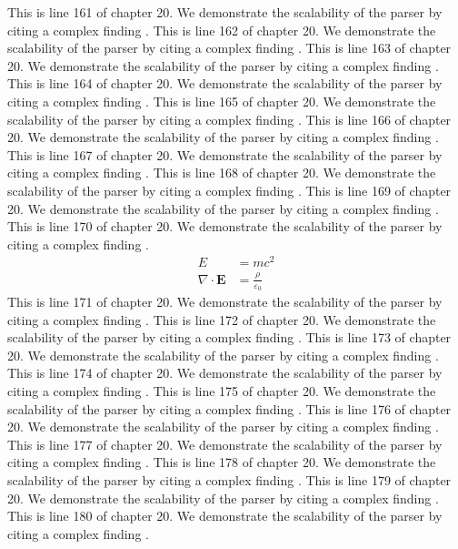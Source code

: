 This is line 161 of chapter 20. We demonstrate the scalability of the parser by citing a complex finding \cite{ref20_161}.
This is line 162 of chapter 20. We demonstrate the scalability of the parser by citing a complex finding \cite{ref20_162}.
This is line 163 of chapter 20. We demonstrate the scalability of the parser by citing a complex finding \cite{ref20_163}.
This is line 164 of chapter 20. We demonstrate the scalability of the parser by citing a complex finding \cite{ref20_164}.
This is line 165 of chapter 20. We demonstrate the scalability of the parser by citing a complex finding \cite{ref20_165}.
This is line 166 of chapter 20. We demonstrate the scalability of the parser by citing a complex finding \cite{ref20_166}.
This is line 167 of chapter 20. We demonstrate the scalability of the parser by citing a complex finding \cite{ref20_167}.
This is line 168 of chapter 20. We demonstrate the scalability of the parser by citing a complex finding \cite{ref20_168}.
This is line 169 of chapter 20. We demonstrate the scalability of the parser by citing a complex finding \cite{ref20_169}.
This is line 170 of chapter 20. We demonstrate the scalability of the parser by citing a complex finding \cite{ref20_170}.
\begin{align*}
  E &= mc^2 \\
  \nabla \cdot \mathbf{E} &= \frac{\rho}{\varepsilon_0}
\end{align*}
This is line 171 of chapter 20. We demonstrate the scalability of the parser by citing a complex finding \cite{ref20_171}.
This is line 172 of chapter 20. We demonstrate the scalability of the parser by citing a complex finding \cite{ref20_172}.
This is line 173 of chapter 20. We demonstrate the scalability of the parser by citing a complex finding \cite{ref20_173}.
This is line 174 of chapter 20. We demonstrate the scalability of the parser by citing a complex finding \cite{ref20_174}.
This is line 175 of chapter 20. We demonstrate the scalability of the parser by citing a complex finding \cite{ref20_175}.
This is line 176 of chapter 20. We demonstrate the scalability of the parser by citing a complex finding \cite{ref20_176}.
This is line 177 of chapter 20. We demonstrate the scalability of the parser by citing a complex finding \cite{ref20_177}.
This is line 178 of chapter 20. We demonstrate the scalability of the parser by citing a complex finding \cite{ref20_178}.
This is line 179 of chapter 20. We demonstrate the scalability of the parser by citing a complex finding \cite{ref20_179}.
This is line 180 of chapter 20. We demonstrate the scalability of the parser by citing a complex finding \cite{ref20_180}.
